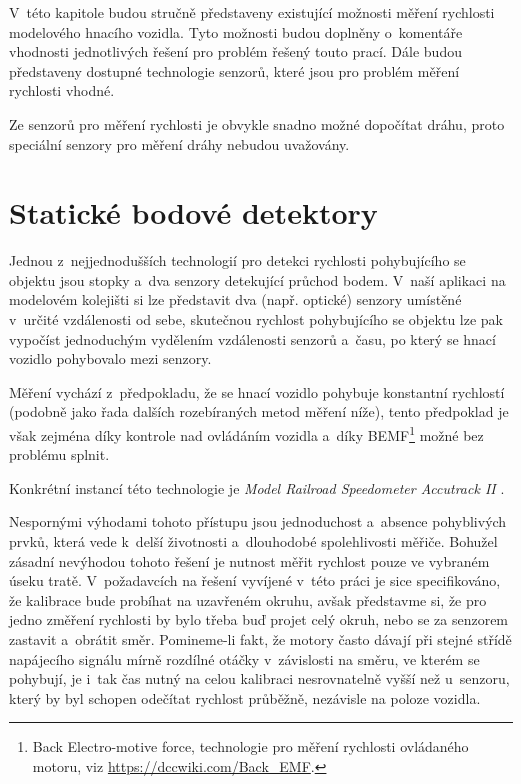 V~této kapitole budou stručně představeny existující možnosti měření rychlosti
modelového hnacího vozidla. Tyto možnosti budou doplněny o~komentáře vhodnosti
jednotlivých řešení pro problém řešený touto prací. Dále budou představeny
dostupné technologie senzorů, které jsou pro problém měření rychlosti vhodné.

Ze senzorů pro měření rychlosti je obvykle snadno možné dopočítat dráhu, proto
speciální senzory pro měření dráhy nebudou uvažovány.

\section{Statické bodové detektory}
\label{sec:det-static}

Jednou z~nejjednodušších technologií pro detekci rychlosti pohybujícího se
objektu jsou stopky a~dva senzory detekující průchod bodem. V~naší aplikaci na
modelovém kolejišti si lze představit dva (např. optické) senzory umístěné
v~určité vzdálenosti od sebe, skutečnou rychlost pohybujícího se objektu lze
pak vypočíst jednoduchým vydělením vzdálenosti senzorů a~času, po který se
hnací vozidlo pohybovalo mezi senzory.

Měření vychází z~předpokladu, že se hnací vozidlo pohybuje konstantní
rychlostí (podobně jako řada dalších rozebíraných metod měření níže), tento
předpoklad je však zejména díky kontrole nad ovládáním vozidla a~díky
\gls{BEMF}\footnote{Back Electro-motive force, technologie pro měření rychlosti
ovládaného motoru, viz \url{https://dccwiki.com/Back\_EMF}.}
možné bez problému splnit.

Konkrétní instancí této technologie je \textit{Model Railroad
Speedometer Accutrack II} \cite{accutrackII}.

Nespornými výhodami tohoto přístupu jsou jednoduchost a~absence pohyblivých
prvků, která vede k~delší životnosti a~dlouhodobé spolehlivosti měřiče.
Bohužel zásadní nevýhodou tohoto řešení je nutnost měřit rychlost pouze ve
vybraném úseku tratě. V~požadavcích na řešení vyvíjené v~této práci je sice
specifikováno, že kalibrace bude probíhat na uzavřeném okruhu, avšak představme
si, že pro jedno změření rychlosti by bylo třeba buď projet celý okruh, nebo se
za senzorem zastavit a~obrátit směr. Pomineme-li fakt, že motory často dávají
při stejné střídě napájecího signálu mírně rozdílné otáčky v~závislosti na
směru, ve kterém se pohybují, je i~tak čas nutný na celou kalibraci
nesrovnatelně vyšší než u~senzoru, který by byl schopen odečítat rychlost
průběžně, nezávisle na poloze vozidla.

